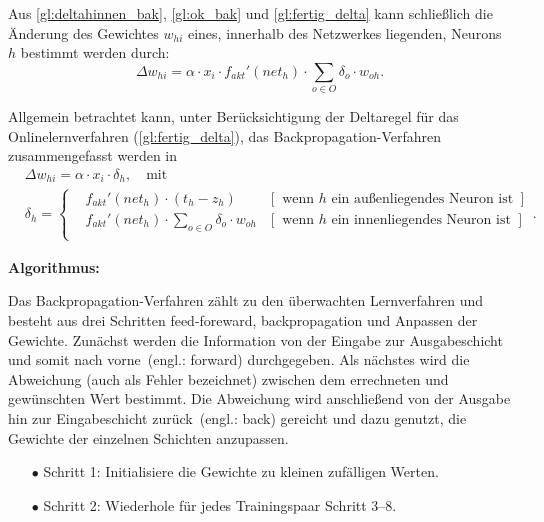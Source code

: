 Aus \autoref{gl:deltahinnen_bak}, \autoref{gl:ok_bak} und \autoref{gl:fertig_delta} kann schließlich die Änderung des Gewichtes $w_{hi}$ eines, innerhalb des Netzwerkes liegenden, Neurons $h$ bestimmt werden durch:
\begin{equation}
\Delta w_{hi} = \alpha \cdot x_{i} \cdot f_{akt}'(net_h) \cdot \sum\limits_{o \in O}  \delta_o \cdot w_{oh}  .
\label{gl:fertiginnen_bak}
\end{equation}

Allgemein betrachtet kann, unter Berücksichtigung der Deltaregel für das Onlinelernverfahren (\autoref{gl:fertig_delta}), das Backpropagation-Verfahren zusammengefasst werden in\,
\begin{align}
\nonumber & \Delta w_{hi}  = \alpha \cdot x_{i} \cdot \delta_h, \quad \text{mit}\\
&\delta_h = \left \{
\begin{aligned}
&f_{akt}'(net_h) \cdot (t_h - z_h) &[\text{ wenn }  h \text{ ein au\ss enliegendes Neuron ist }]\\ 
&f_{akt}'(net_h) \cdot \sum\limits_{o \in O}  \delta_o \cdot w_{oh} &[\text{ wenn }  h \text{ ein innenliegendes Neuron ist }]\\
\end{aligned}
.
\right.
\label{gl:fertigbeide_bak}
\end{align}

\textbf{Algorithmus:}\,

Das Backpropagation-Verfahren zählt zu den überwachten Lernverfahren und besteht aus drei Schritten feed-foreward, backpropagation und Anpassen der Gewichte. Zunächst werden die Information von der Eingabe zur Ausgabeschicht und somit nach \glqq vorne\grqq~(engl.: forward) durchgegeben. Als nächstes wird die Abweichung (auch als Fehler bezeichnet) zwischen dem errechneten und gewünschten Wert bestimmt. Die Abweichung wird anschließend von der Ausgabe hin zur Eingabeschicht \glqq zurück\grqq~(engl.: back) gereicht und dazu genutzt, die Gewichte der einzelnen Schichten anzupassen.

\begin{itemize}
\item[\textbf{$\bullet$}] Schritt 1: Initialisiere die Gewichte zu kleinen zufälligen Werten.
\item[\textbf{$\bullet$}] Schritt 2: Wiederhole für jedes Trainingspaar Schritt 3--8.
\end{itemize}


